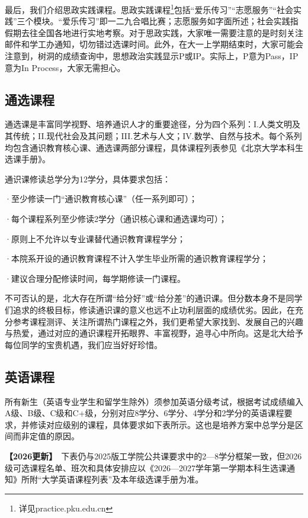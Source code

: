 \documentclass[11pt,oneside]{book}
\newcommand{\updateMark}{\textcolor{chaph}{\textbf{【2026更新】}}\ }
\begin{document}
\vspace{10pt}

最后，我们介绍思政实践课程。思政实践课程\footnote{详见practice.pku.edu.cn}包括“爱乐传习”“志愿服务”“社会实践”三个模块。“爱乐传习”即一二九合唱比赛；志愿服务如字面所述；社会实践指假期去往全国各地进行实地考察。对于思政实践，大家唯一需要注意的是时刻关注邮件和学工办通知，切勿错过选课时间。此外，在大一上学期结束时，大家可能会注意到，树洞的成绩查询中，思想政治实践显示P或IP。实际上，P意为Pass，IP意为In Process，大家无需担心。

\subsection{通选课程}
通选课是丰富同学视野、培养通识人才的重要途径，分为四个系列：I.人类文明及其传统；II.现代社会及其问题；III.艺术与人文；IV.数学、自然与技术。每个系列均包含通识教育核心课、通选课两部分课程，具体课程列表参见《北京大学本科生选课手册》。

\vspace{10pt}

通识课修读总学分为12学分，具体要求包括：

·至少修读一门“通识教育核心课”（任一系列即可）；

·每个课程系列至少修读2学分（通识核心课和通选课均可）；

·原则上不允许以专业课替代通识教育课程学分；

·本院系开设的通识教育课程不计入学生毕业所需的通识教育课程学分；

·建议合理分配修读时间，每学期修读一门课程。

\vspace{10pt}

不可否认的是，北大存在所谓“给分好”或“给分差”的通识课。但分数本身不是同学们追求的终极目标，修读通识课的意义也远不止功利层面的成绩优劣。因此，在充分参考课程测评、关注所谓热门课程之外，我们更希望大家找到、发展自己的兴趣与热爱，通过对应的通识课程开拓眼界、丰富视野，追寻心中所向。这是北大给予每位同学的宝贵机遇，我们应当好好珍惜。

\subsection{英语课程}
所有新生（英语专业学生和留学生除外）须参加英语分级考试，根据考试成绩编入A级、B级、C级和C+级，分别对应8学分、6学分、4学分和2学分的英语课程要求，并修读对应级别的课程，具体要求如下表所示。这也是培养方案中总学分是区间而非定值的原因。

\updateMark 下表仍与2025版工学院公共课要求中的2—8学分框架一致，但2026级可选课程名单、班次和具体安排应以《2026—2027学年第一学期本科生选课通知》所附“大学英语课程列表”及本年级选课手册为准。
\end{document}
